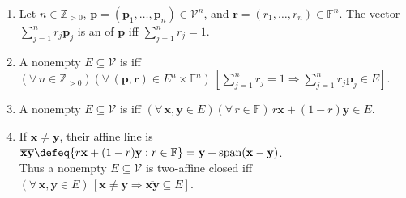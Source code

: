 \begin{definition} \label{def:affine-combination-and-closed-set} 
\begin{enumerate}[label=(\roman*)]
\setlength{\itemsep}{0pt}
\item Let $n\in\mathbb{Z}_{>0}$, $\mathbf{p}=(\mathbf{p}_1,\ldots,\mathbf{p}_n)\in\mathcal{V}^n$, and $\mathbf{r}=(r_1,\ldots,r_n)\in\mathbb{F}^n$. The vector $\sum\limits_{j=1}^n r_j\mathbf{p}_j$ is an  of $\mathbf{p}$ iff $\sum\limits_{j=1}^n r_j=1$.
\item A nonempty $E\subseteq\mathcal{V}$ is  iff $(\forall\,n\in\mathbb{Z}_{>0})(\forall\,(\mathbf{p},\mathbf{r})\in E^n\times\mathbb{F}^n)\,[\sum\limits_{j=1}^n r_j=1\Rightarrow\sum\limits_{j=1}^n r_j\mathbf{p}_j\in E]$.
\item A nonempty $E\subseteq\mathcal{V}$ is  iff $(\forall\,\mathbf{x},\mathbf{y}\in E)(\forall\,r\in\mathbb{F})\,r\mathbf{x}+(1-r)\mathbf{y}\in E$.
\item If $\mathbf{x}\neq\mathbf{y}$, their affine line is $\overline{\mathbf{x}\mathbf{y}}\defeq\{r\mathbf{x}+(1-r)\mathbf{y}:r\in\mathbb{F}\}=\mathbf{y}+\operatorname{span}(\mathbf{x}-\mathbf{y})$.\\
Thus a nonempty $E\subseteq\mathcal{V}$ is two-affine closed iff $(\forall\,\mathbf{x},\mathbf{y}\in E)\,[\mathbf{x}\neq\mathbf{y}\Rightarrow\overline{\mathbf{x}\mathbf{y}}\subseteq E]$.
\end{enumerate}
\end{definition}

